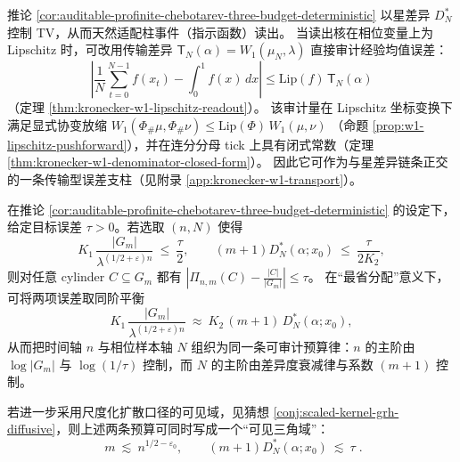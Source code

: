 \begin{remark}\label{rem:auditable-profinite-chebotarev-w1-transport}
推论 \ref{cor:auditable-profinite-chebotarev-three-budget-deterministic} 以星差异 \(D_N^*\) 控制 TV，从而天然适配柱事件（指示函数）读出。
当读出核在相位变量上为 Lipschitz 时，可改用传输差异
\(
\mathsf{T}_N(\alpha)=W_1(\mu_N,\lambda)
\)
直接审计经验均值误差：
\[
\left|\frac1N\sum_{t=0}^{N-1}f(x_t)-\int_0^1 f(x)\,dx\right|
\le
\mathrm{Lip}(f)\,\mathsf{T}_N(\alpha)
\]
（定理 \ref{thm:kronecker-w1-lipschitz-readout}）。
该审计量在 Lipschitz 坐标变换下满足显式协变放缩
\(
W_1(\Phi_\#\mu,\Phi_\#\nu)\le \mathrm{Lip}(\Phi)\,W_1(\mu,\nu)
\)
（命题 \ref{prop:w1-lipschitz-pushforward}），并在连分分母 tick 上具有闭式常数（定理 \ref{thm:kronecker-w1-denominator-closed-form}）。
因此它可作为与星差异链条正交的一条传输型误差支柱（见附录 \ref{app:kronecker-w1-transport}）。
\end{remark}

\begin{corollary}\label{cor:auditable-profinite-chebotarev-balance-triangle}
在推论 \ref{cor:auditable-profinite-chebotarev-three-budget-deterministic} 的设定下，给定目标误差 \(\tau>0\)。若选取 \((n,N)\) 使得
\[
K_1\,\frac{|G_m|}{\lambda^{(1/2+\varepsilon)n}}\ \le\ \frac{\tau}{2},
\qquad
(m+1)D_N^*(\alpha;x_0)\ \le\ \frac{\tau}{2K_2},
\]
则对任意 cylinder \(C\subseteq G_m\) 都有
\(
\left|\Pi_{n,m}(C)-\frac{|C|}{|G_m|}\right|\le \tau
\)。
在“最省分配”意义下，可将两项误差取同阶平衡
\[
K_1\,\frac{|G_m|}{\lambda^{(1/2+\varepsilon)n}}
\ \approx\
K_2\,(m+1)\,D_N^*(\alpha;x_0),
\]
从而把时间轴 \(n\) 与相位样本轴 \(N\) 组织为同一条可审计预算律：\(n\) 的主阶由 \(\log|G_m|\) 与 \(\log(1/\tau)\) 控制，而 \(N\) 的主阶由差异度衰减律与系数 \((m+1)\) 控制。
\par
若进一步采用尺度化扩散口径的可见域，见猜想 \ref{conj:scaled-kernel-grh-diffusive}，则上述两条预算可同时写成一个“可见三角域”：
\[
\boxed{\;
m\ \lesssim\ n^{1/2-\varepsilon_0},
\qquad
(m+1)D_N^*(\alpha;x_0)\ \lesssim\ \tau\; }.
\]
\end{corollary}

